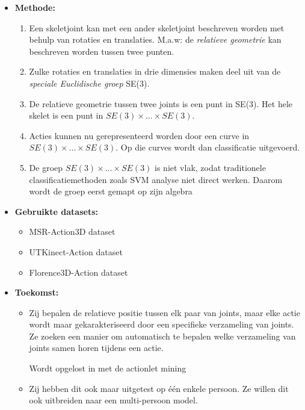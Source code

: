 \begin{itemize}
\begin{itemize}
		\item \textbf{Methode:}
		\begin{enumerate}
			\item Een skeletjoint kan met een ander skeletjoint beschreven worden met behulp van rotaties en translaties. M.a.w: de \textit{relatieve geometrie} kan beschreven worden tussen twee punten.
			\item Zulke rotaties en translaties in drie dimensies maken deel uit van de \textit{speciale Euclidische groep} SE(3).
			\item De relatieve geometrie tussen twee joints is een punt in SE(3). Het hele skelet is een punt in $SE(3) \times ... \times SE(3)$.
			\item Acties kunnen nu gerepresenteerd worden door een curve in $SE(3) \times ... \times SE(3)$. Op die curves wordt dan classificatie uitgevoerd.
			\item De groep $SE(3) \times ... \times SE(3)$ is niet vlak, zodat traditionele classificatiemethoden zoals SVM analyse niet direct werken. Daarom wordt de groep eerst gemapt op zijn algebra 
		\end{enumerate}
		\item \textbf{Gebruikte datasets:}
		\begin{itemize}
			\item MSR-Action3D dataset
			\item UTKinect-Action dataset
			\item Florence3D-Action dataset
		\end{itemize}
		\item \textbf{Toekomst:}
		\begin{itemize}
			\item Zij bepalen de relatieve positie tussen elk paar van joints, maar elke actie wordt maar gekarakteriseerd door een specifieke verzameling van joints. Ze zoeken een manier om automatisch te bepalen welke verzameling van joints samen horen tijdens een actie. 
			
			{\color{green}Wordt opgelost in \cite{Wang2012b} met de actionlet mining}
			\item Zij hebben dit ook maar uitgetest op één enkele persoon. Ze willen dit ook uitbreiden naar een multi-persoon model.
		\end{itemize}
	\end{itemize}


\end{itemize}
